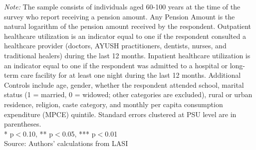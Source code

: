 \documentclass[
  11pt,
]{article}
\begin{document}
\begin{table}[H]
\centering
\vspace{1.8mm}
\caption{Outpatient and Inpatient Healthcare Utilization and Pension Amount}
\label{tab:pension_amount_out_inp}
\vspace{3mm}
\vspace{2mm}
\begin{minipage}{0.95\textwidth}
\footnotesize \textit{Note:} The sample consists of individuals aged 60-100 years at the time of the survey who report receiving a pension amount. Any Pension Amount is the natural logarithm of the pension amount received by the respondent. Outpatient healthcare utilization is an indicator equal to one if the respondent consulted a healthcare provider (doctors, AYUSH practitioners, dentists, nurses, and traditional healers) during the last 12 months. Inpatient healthcare utilization is an indicator equal to one if the respondent was admitted to a hospital or long-term care facility for at least one night during the last 12 months. Additional Controls include age, gender, whether the respondent attended school, marital status (1 = married, 0 = widowed; other categories are excluded), rural or urban residence, religion, caste category, and monthly per capita consumption expenditure (MPCE) quintile. Standard errors clustered at PSU level are in parentheses. \\ * p$<$0.10, ** p$<$0.05, *** p$<$0.01\\
Source: Authors' calculations from LASI
\end{minipage}
\end{table}
\end{document}
